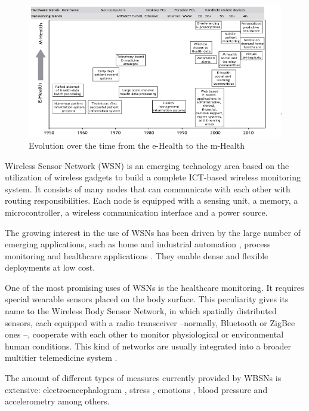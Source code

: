 \begin{figure}[!ht]
\centering
\includegraphics[width=\textwidth]{images/ehealth_evol.png}
\caption{Evolution over the time from the e-Health to the m-Health}
\label{fig:e2m_health}
\end{figure}

Wireless Sensor Network (WSN) is an emerging technology area based on the utilization of wireless gadgets to build a complete ICT-based wireless monitoring system. It consists of many nodes that can communicate with each other with routing responsibilities. Each node is equipped with a sensing unit, a memory, a microcontroller, a wireless communication interface and a power source.


The growing interest in the use of WSNs has been driven by the large number of emerging applications, such as home and industrial automation \cite{gomez2010wireless,akerberg2011future}, process monitoring \cite{zapater2012ubiquitous, khanna2012machine} and healthcare applications \cite{journals/jst/AbidoyeAAAN11, ko2010wireless, pawar2012framework}. They enable dense and flexible deployments at low cost.


One of the most promising uses of WSNs is the healthcare monitoring. It requires special wearable sensors placed on the  body surface. This peculiarity gives its name to the Wireless Body Sensor Network, in which spatially distributed sensors, each equipped with a radio transceiver --normally, Bluetooth or ZigBee ones \cite{chen2013review}--, cooperate with each other to monitor physiological or environmental human conditions. This kind of networks are usually integrated into a broader multitier telemedicine system \cite{Otto:2005:SAW:2010498.2010502, journals/jst/AbidoyeAAAN11, chen2013review, jovanov2011body, jovanov2009system}.


The amount of different types of measures currently provided by WBSNs is extensive:  electroencephalogram \cite{dilmaghani2011wireless}, stress \cite{jovanov2003stress}, emotions \cite{nasoz2004emotion}, blood pressure \cite{espina2006wireless} and accelerometry \cite{chung2008wireless} among others.



